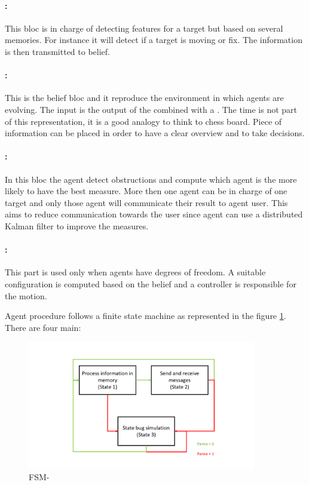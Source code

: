 \paragraph{:} This bloc is in charge of detecting features for a target but based on several memories. For instance it will detect if a target is moving or fix. The information is then transmitted to belief.

\paragraph{:} This is the belief bloc and it reproduce the environment in which agents are evolving. The input is the output of the  combined with a . The time is not part of this representation, it is a good analogy to think to chess board. Piece of information can be placed in order to have a clear overview and to take decisions.

\paragraph{:} In this bloc the agent detect obstructions and compute which agent is the more likely to have the best measure. More then one agent can be in charge of one target and only those agent will communicate their result to agent user. This aims to reduce communication  towards the user since agent can use a distributed Kalman filter to improve the measures.

\paragraph{:} This part is used only when agents have degrees of freedom. A suitable configuration is computed based on the belief and a controller is responsible for the motion. 

\label{agent-camera_finite_state_machine}
Agent procedure follows a finite state machine as represented in the figure \ref{fig:FSM_agent_camera}. There are four main:
\begin{figure}
    \centering
    \includegraphics[page=2,clip,width = 10cm]{systeme_multi_agent/realisation/multi_agent_implemented_schematic.pdf}
    \caption{FSM-}
    \label{fig:FSM_agent_camera}
\end{figure}

